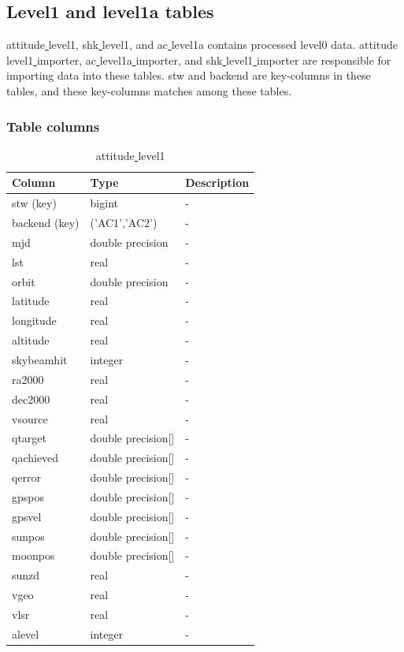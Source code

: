 \documentclass[12pt]{article}
\begin{document}
\clearpage
\newpage

\subsection{Level1 and level1a tables}
attitude\underline{ }level1, shk\underline{ }level1, and
ac\underline{ }level1a contains processed level0 data.
attitude\underline{ }level1\underline{ }importer,
ac\underline{ }level1a\underline{ }importer,
and shk\underline{ }level1\underline{ }importer
are responsible for importing data into these tables.
stw and backend are key-columns in these tables,
and these key-columns matches among these tables.


\subsubsection*{Table columns}

\begin{table}[ht]
\caption{attitude\underline{ }level1}
\centering
\begin{tabular}{l l l}
\hline\hline
Column & Type & Description \\ [0.5ex]
\hline
 stw (key)  & bigint             & - \\
 backend (key) & ('AC1','AC2')      & - \\           
 mjd        & double precision   & - \\  
 lst        & real               & - \\   
 orbit      & double precision   & - \\   
 latitude   & real               & - \\    
 longitude  & real               & - \\    
 altitude   & real               & - \\    
 skybeamhit & integer            & - \\    
 ra2000     & real               & - \\    
 dec2000    & real               & - \\    
 vsource    & real               & - \\    
 qtarget    & double precision[] & - \\ 
 qachieved  & double precision[] & - \\ 
 qerror     & double precision[] & - \\ 
 gpspos     & double precision[] & - \\    
 gpsvel     & double precision[] & - \\  
 sunpos     & double precision[] & - \\  
 moonpos    & double precision[] & - \\  
 sunzd      & real               & - \\  
 vgeo       & real               & - \\ 
 vlsr       & real               & - \\ 
 alevel     & integer            & -\\[1ex]
\hline
\end{tabular}
\label{table:att1}
\end{table}
\end{document}
